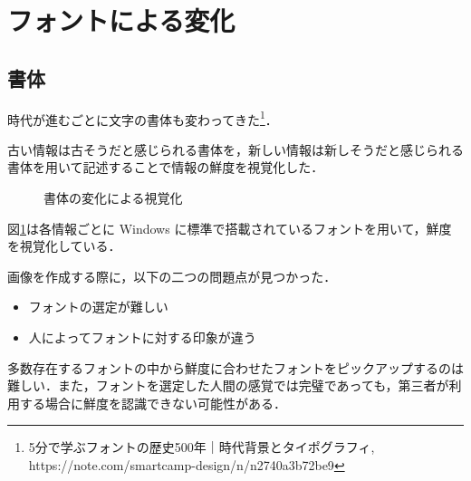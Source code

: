 \section{フォントによる変化}
\label{sec:ver-font}

\subsection{書体}
\label{subsec:ver-fnt-stl}

時代が進むごとに文字の書体も変わってきた\footnote{5分で学ぶフォントの歴史500年｜時代背景とタイポグラフィ, https://note.com/smartcamp-design/n/n2740a3b72be9}．

古い情報は古そうだと感じられる書体を，新しい情報は新しそうだと感じられる書体を用いて記述することで情報の鮮度を視覚化した．

\begin{figure}[htbp]
  \begin{center}
  \end{center}
  \caption{書体の変化による視覚化}
  \label{fig:ver-style}
\end{figure}

図\ref{fig:ver-style}は各情報ごとに Windows に標準で搭載されているフォントを用いて，鮮度を視覚化している．

画像を作成する際に，以下の二つの問題点が見つかった．

\begin{itemize}
  \item フォントの選定が難しい
  \item 人によってフォントに対する印象が違う
\end{itemize}

多数存在するフォントの中から鮮度に合わせたフォントをピックアップするのは難しい．また，フォントを選定した人間の感覚では完璧であっても，第三者が利用する場合に鮮度を認識できない可能性がある．

